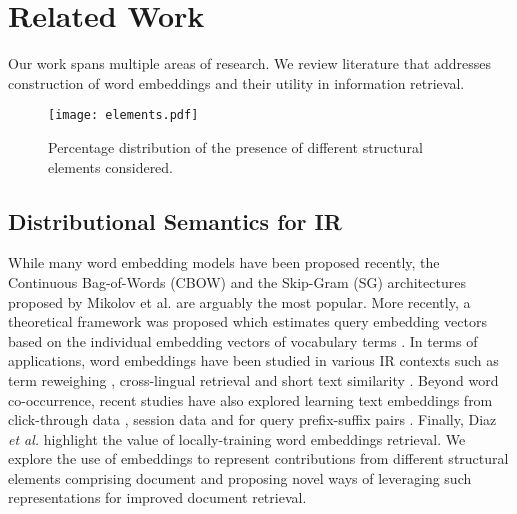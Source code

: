\section{Related Work}
\label{sec:related_work}
Our work spans multiple areas of research. We review literature that addresses 
construction of word embeddings and their utility in information retrieval.
\begin{figure}[t]
        \centering
        \texttt{[image: elements.pdf]}
        \caption{Percentage distribution of the presence of different structural 
elements considered.}
        \label{fig:elements}
\end{figure}
\subsection{Distributional Semantics for IR}
While many word embedding models have been proposed recently, the Continuous 
Bag-of-Words (CBOW) and the Skip-Gram
(SG) architectures proposed by Mikolov et al. \cite{mikolov2013distributed} are 
arguably the most popular. More recently, a theoretical framework was proposed 
which estimates query embedding vectors based on the individual embedding 
vectors of vocabulary terms \cite{zamani2016estimating}. In terms of 
applications, word embeddings have been studied in various IR contexts such as 
term reweighing \cite{zheng2015learning}, cross-lingual retrieval 
\cite{vulic2015monolingual} and short text similarity 
\cite{kenter2015short}. Beyond word co-occurrence, recent studies have also 
explored learning text embeddings from click-through data 
\cite{shen2014learning}, session data \cite{grbovic2015context} and for query 
prefix-suffix pairs \cite{mitra2015query}. Finally, Diaz \textit{et al.} 
\cite{diaz2016query} highlight the value of locally-training word embeddings retrieval. 
We explore the use of embeddings to represent 
contributions from different structural elements comprising document and 
proposing novel ways of leveraging such representations for improved document 
retrieval.

